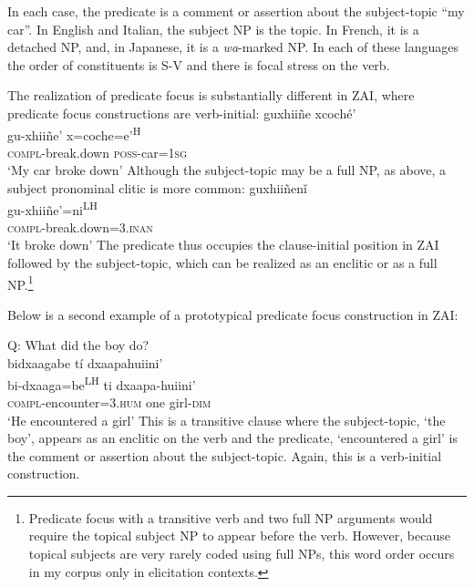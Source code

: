
In each case, the predicate is a comment or assertion about the subject-topic ``my car''. In English and Italian, the subject NP is the topic. In French, it is a detached NP, and, in Japanese, it is a \textit{wa}-marked NP. In each of these languages the order of constituents is S-V and there is focal stress on the verb. 

The realization of predicate focus is substantially different in ZAI, where predicate focus constructions are verb-initial: 
\ea\label{predfoc1}
\glll guxhii\~{n}e xcoch\'{e}'  \\
gu-xhii\~{n}e' x=coche=e'\textsuperscript{H}  \\
\textsc{compl}-break.down \textsc{poss}-car=\textsc{1sg}  \\
\glt `My car broke down'
\z
Although the subject-topic may be a full NP, as above, a subject pronominal clitic is more common:
\ea\label{predfoc2}
\glll guxhii\~{n}en\v{i} \\
gu-xhii\~{n}e'=ni\textsuperscript{LH}  \\
\textsc{compl}-break.down=\textsc{3.inan} \\
\glt `It broke down'
\z
The predicate thus occupies the clause-initial position in ZAI followed by the subject-topic, which can be realized as an enclitic or as a full NP.\footnote{Predicate focus with a transitive verb and two full NP arguments would require the topical subject NP to appear before the verb. However, because topical subjects are very rarely coded using full NPs, this word order occurs in my corpus only in elicitation contexts.}

Below is a second example of a prototypical predicate focus construction in ZAI:

\ea\label{predfocus}
{Q: What did the boy do?} \\
\glll bidxaagabe t\'{i} dxaapahuiini' \\
bi-dxaaga=be\textsuperscript{LH} ti dxaapa-huiini' \\
\textsc{compl}-encounter=\textsc{3.hum} one girl-\textsc{dim} \\
\glt `He encountered a girl' 
\z
This is a transitive clause where the subject-topic, `the boy', appears as an enclitic on the verb and the predicate, `encountered a girl' is the comment or assertion about the subject-topic. Again, this is a verb-initial construction.

